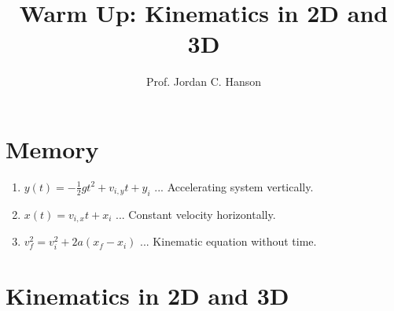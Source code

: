\documentclass{article}
\begin{document}
\title{Warm Up: Kinematics in 2D and 3D}
\author{Prof. Jordan C. Hanson}

\maketitle

\section{Memory}

\begin{enumerate}
\item $y(t) = -\frac{1}{2}g t^2 + v_{i,y} t + y_i$ ... Accelerating system vertically.
\item $x(t) = v_{i,x} t + x_i$ ... Constant velocity horizontally.
\item $v_f^2 = v_i^2 + 2 a (x_f - x_i)$ ... Kinematic equation without time.
\end{enumerate}

\section{Kinematics in 2D and 3D}
\end{document}
